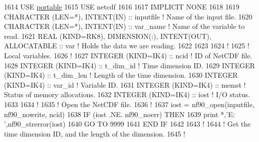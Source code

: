 \begin{DoxyCode}
1614     \textcolor{keywordtype}{USE }\hyperlink{namespaceportable}{portable}
1615     \textcolor{keywordtype}{USE }netcdf
1616 
1617     \textcolor{keywordtype}{IMPLICIT NONE}
1618 
1619     \textcolor{keywordtype}{CHARACTER (LEN=*)}, \textcolor{keywordtype}{INTENT(IN)}                                       :: inputfile    \textcolor{comment}{! Name of the input
       file.}
1620     \textcolor{keywordtype}{CHARACTER (LEN=*)}, \textcolor{keywordtype}{INTENT(IN)}                                       :: var\_name     \textcolor{comment}{! Name of the
       variable to read.}
1621     \textcolor{keywordtype}{REAL (KIND=RK8)}, \textcolor{keywordtype}{DIMENSION(:)}, \textcolor{keywordtype}{INTENT(OUT)}, \textcolor{keywordtype}{ALLOCATABLE}             :: var          \textcolor{comment}{! Holds the data we
       are reading.}
1622 
1623 
1624     \textcolor{comment}{!}
1625     \textcolor{comment}{! Local variables.}
1626     \textcolor{comment}{!}
1627     \textcolor{keywordtype}{INTEGER (KIND=IK4)}          :: ncid                                                 \textcolor{comment}{! ID of NetCDF
       file.}
1628     \textcolor{keywordtype}{INTEGER (KIND=IK4)}          :: t\_dim\_id                                             \textcolor{comment}{! Time dimension
       ID.}
1629     \textcolor{keywordtype}{INTEGER (KIND=IK4)}          :: t\_dim\_len                                            \textcolor{comment}{! Length of the
       time dimension.}
1630     \textcolor{keywordtype}{INTEGER (KIND=IK4)}          :: var\_id                                               \textcolor{comment}{! Variable ID.}
1631     \textcolor{keywordtype}{INTEGER (KIND=IK4)}          :: memst                                                \textcolor{comment}{! Status of memory
       allocations.}
1632     \textcolor{keywordtype}{INTEGER (KIND=IK4)}          :: iost                                                 \textcolor{comment}{! I/O status.}
1633 
1634     \textcolor{comment}{!}
1635     \textcolor{comment}{! Open the NetCDF file.}
1636     \textcolor{comment}{!}
1637     iost    = nf90\_open(inputfile, nf90\_nowrite, ncid)
1638     \textcolor{keywordflow}{IF} (iost .NE. nf90\_noerr) \textcolor{keywordflow}{THEN}
1639         print *,\textcolor{stringliteral}{'E: '},nf90\_strerror(iost)
1640         \textcolor{keywordflow}{GO TO} 9999
1641 \textcolor{keywordflow}{    END IF}
1642 
1643     \textcolor{comment}{!}
1644     \textcolor{comment}{! Get the time dimension ID, and the length of the dimension.}
1645     \textcolor{comment}{!}

\end{DoxyCode}
